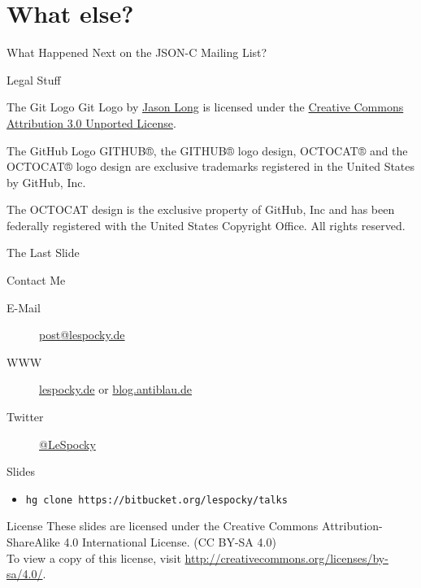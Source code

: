 \documentclass{beamer}
\begin{document}
\section*{What else?}

\begin{frame}{What Happened Next on the JSON-C Mailing List?}
\end{frame}

\begin{frame}{Legal Stuff}
    \begin{block}{The Git Logo}
        Git Logo by \href{http://twitter.com/jasonlong}{Jason Long} is
        licensed under the
        \href{http://creativecommons.org/licenses/by/3.0/}{Creative Commons Attribution 3.0 Unported License}.
    \end{block}
    \begin{block}{The GitHub Logo}
        GITHUB®, the GITHUB® logo design, OCTOCAT® and the OCTOCAT® logo
        design are exclusive trademarks registered in the United States
        by GitHub, Inc.

        The OCTOCAT design is the exclusive property of GitHub, Inc and
        has been federally registered with the United States Copyright
        Office. All rights reserved.
    \end{block}
\end{frame}

\begin{frame}{The Last Slide}
    \begin{block}{Contact Me}
        \begin{description}
            \item [E-Mail] \href{mailto:post@lespocky.de}{post@lespocky.de}
            \item [WWW] \href{http://www.lespocky.de/}{lespocky.de} or
                    \href{http://blog.antiblau.de/}{blog.antiblau.de}
            \item [Twitter] \href{https://twitter.com/LeSpocky}{@LeSpocky}
        \end{description}
    \end{block}
    \begin{block}{Slides}
        \begin{itemize}
            \item \texttt{hg clone https://bitbucket.org/lespocky/talks}
        \end{itemize}
    \end{block}
    \begin{block}{License}
        These slides are licensed under the Creative Commons
        Attribution-ShareAlike 4.0 International License. (CC BY-SA 4.0) \\
        To view a copy of this license, visit
        \url{http://creativecommons.org/licenses/by-sa/4.0/}.
    \end{block}
\end{frame}
\end{document}
